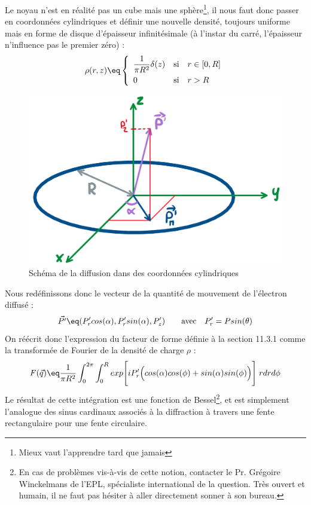 Le noyau n'est en réalité pas un cube mais une sphère\footnote{Mieux vaut l'apprendre tard que jamais}, il nous faut donc passer en coordonnées cylindriques et définir une nouvelle densité, toujours uniforme mais en forme de disque d'épaisseur infinitésimale (à l'instar du carré, l'épaisseur n'influence pas le premier zéro) :
    \begin{equation*}
        \rho(r,z) \eq
        \left\{
        \begin{array}{lll}
            \dfrac{1}{\pi R^2} \delta(z) &  \text{si} & r \in [0,R]\\[7pt]
            0 & \text{si} & r > R 
        \end{array}
        \right.
    \end{equation*}
     \begin{figure}[H]
    \centering
    \includegraphics[scale=.4]{Images4/noyau_disque.png}
    \caption{Schéma de la diffusion dans des coordonnées cylindriques}
    \label{fig:Schéma coordonnées sphériques}
\end{figure}
Nous redéfinissons donc le vecteur de la quantité de mouvement de l'électron diffusé :
\begin{equation*}
    \vec{P'} \eq (P'_r cos(\alpha), P'_r sin(\alpha), P'_z)
    \qquad \text{avec} \quad P'_r = P sin(\theta)
\end{equation*}
On réécrit donc l'expression du facteur de forme définie à la section 11.3.1 comme la transformée de Fourier de la densité de charge $\rho$ :
\begin{equation*}
    F(\vec{q}) \eq \frac{1}{\pi R^2}\int_0^{2\pi} \int_0^R exp\Bigg[ iP'_r \Big(cos(\alpha)cos(\phi) + sin(\alpha)sin(\phi) \Big) \Bigg] \; r dr d\phi
\end{equation*}
Le résultat de cette intégration est une fonction de Bessel\footnote{En cas de problèmes vis-à-vis de cette notion, contacter le Pr. Grégoire Winckelmans de l'EPL, spécialiste international de la question. Très ouvert et humain, il ne faut pas hésiter à aller directement sonner à son bureau.}, et est simplement l'analogue des sinus cardinaux associés à la diffraction à travers une fente rectangulaire pour une fente circulaire.

